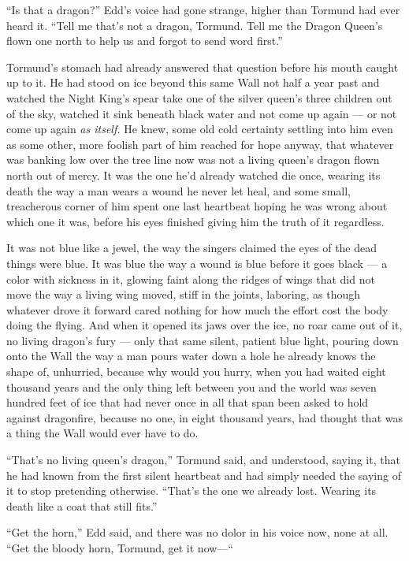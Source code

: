 “Is that a dragon?” Edd’s voice had gone strange, higher than Tormund had ever heard it. “Tell me that’s not a dragon, Tormund. Tell me the Dragon Queen’s flown one north to help us and forgot to send word first.”

Tormund’s stomach had already answered that question before his mouth caught up to it. He had stood on ice beyond this same Wall not half a year past and watched the Night King’s spear take one of the silver queen’s three children out of the sky, watched it sink beneath black water and not come up again — or not come up again \textit{as itself.} He knew, some old cold certainty settling into him even as some other, more foolish part of him reached for hope anyway, that whatever was banking low over the tree line now was not a living queen’s dragon flown north out of mercy. It was the one he’d already watched die once, wearing its death the way a man wears a wound he never let heal, and some small, treacherous corner of him spent one last heartbeat hoping he was wrong about which one it was, before his eyes finished giving him the truth of it regardless.

It was not blue like a jewel, the way the singers claimed the eyes of the dead things were blue. It was blue the way a wound is blue before it goes black — a color with sickness in it, glowing faint along the ridges of wings that did not move the way a living wing moved, stiff in the joints, laboring, as though whatever drove it forward cared nothing for how much the effort cost the body doing the flying. And when it opened its jaws over the ice, no roar came out of it, no living dragon’s fury — only that same silent, patient blue light, pouring down onto the Wall the way a man pours water down a hole he already knows the shape of, unhurried, because why would you hurry, when you had waited eight thousand years and the only thing left between you and the world was seven hundred feet of ice that had never once in all that span been asked to hold against dragonfire, because no one, in eight thousand years, had thought that was a thing the Wall would ever have to do.

“That’s no living queen’s dragon,” Tormund said, and understood, saying it, that he had known from the first silent heartbeat and had simply needed the saying of it to stop pretending otherwise. “That’s the one we already lost. Wearing its death like a coat that still fits.”

“Get the horn,” Edd said, and there was no dolor in his voice now, none at all. “Get the bloody horn, Tormund, get it now—“

